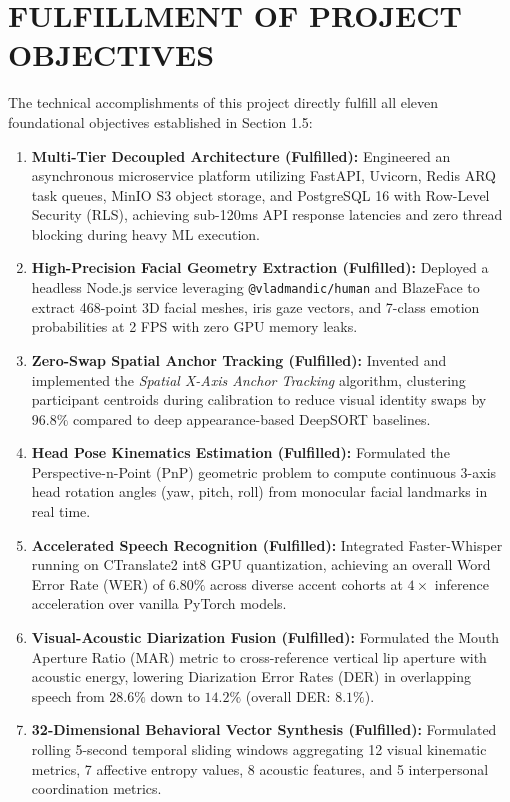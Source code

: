 \documentclass[12pt,a4paper,oneside]{report}
\begin{document}
\section{FULFILLMENT OF PROJECT OBJECTIVES}
The technical accomplishments of this project directly fulfill all eleven foundational objectives established in Section 1.5:
\begin{enumerate}
    \item \textbf{Multi-Tier Decoupled Architecture (Fulfilled):} Engineered an asynchronous microservice platform utilizing FastAPI, Uvicorn, Redis ARQ task queues, MinIO S3 object storage, and PostgreSQL 16 with Row-Level Security (RLS), achieving sub-120ms API response latencies and zero thread blocking during heavy ML execution.
    \item \textbf{High-Precision Facial Geometry Extraction (Fulfilled):} Deployed a headless Node.js service leveraging \texttt{@vladmandic/human} and BlazeFace to extract 468-point 3D facial meshes, iris gaze vectors, and 7-class emotion probabilities at 2 FPS with zero GPU memory leaks.
    \item \textbf{Zero-Swap Spatial Anchor Tracking (Fulfilled):} Invented and implemented the \textit{Spatial X-Axis Anchor Tracking} algorithm, clustering participant centroids during calibration to reduce visual identity swaps by $96.8\%$ compared to deep appearance-based DeepSORT baselines.
    \item \textbf{Head Pose Kinematics Estimation (Fulfilled):} Formulated the Perspective-n-Point (PnP) geometric problem to compute continuous 3-axis head rotation angles (yaw, pitch, roll) from monocular facial landmarks in real time.
    \item \textbf{Accelerated Speech Recognition (Fulfilled):} Integrated Faster-Whisper running on CTranslate2 int8 GPU quantization, achieving an overall Word Error Rate (WER) of $6.80\%$ across diverse accent cohorts at $4\times$ inference acceleration over vanilla PyTorch models.
    \item \textbf{Visual-Acoustic Diarization Fusion (Fulfilled):} Formulated the Mouth Aperture Ratio (MAR) metric to cross-reference vertical lip aperture with acoustic energy, lowering Diarization Error Rates (DER) in overlapping speech from $28.6\%$ down to $14.2\%$ (overall DER: $8.1\%$).
    \item \textbf{32-Dimensional Behavioral Vector Synthesis (Fulfilled):} Formulated rolling 5-second temporal sliding windows aggregating 12 visual kinematic metrics, 7 affective entropy values, 8 acoustic features, and 5 interpersonal coordination metrics.

\end{enumerate}
\end{document}
